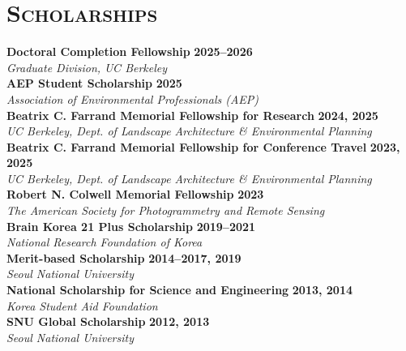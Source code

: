 \newcommand{\scholarship}[2]
  {\small \textbf{\color{maincolor} #1}
  \hfill \textbf{{\color{hlcolor-0} #2}}}
  
\newcommand{\sponsor}[1]
  {\small \color{hlcolor-0} \emph{#1}}
  
\section*{\textsc{Scholarships}}
\begin{cvcontent}
  \scholarship{Doctoral Completion Fellowship}{2025--2026}\\
  \sponsor{Graduate Division, UC Berkeley}\\ [0.5mm]
  \scholarship{AEP Student Scholarship}{2025}\\
  \sponsor{Association of Environmental Professionals (AEP)}\\ [0.5mm]
  \scholarship{Beatrix C. Farrand Memorial Fellowship for Research}{2024, 2025}\\
  \sponsor{UC Berkeley, Dept. of Landscape Architecture \& Environmental Planning}\\ [0.5mm]
  \scholarship{Beatrix C. Farrand Memorial Fellowship for Conference Travel}{2023, 2025}\\
  \sponsor{UC Berkeley, Dept. of Landscape Architecture \& Environmental Planning}\\ [0.5mm]
  \scholarship{Robert N. Colwell Memorial Fellowship}{2023}\\
  \sponsor{The American Society for Photogrammetry and Remote Sensing}\\[0.5mm]
  \scholarship{Brain Korea 21 Plus Scholarship}{2019--2021}\\
  \sponsor{National Research Foundation of Korea}\\ [0.5mm]
  \scholarship{Merit-based Scholarship}{2014--2017, 2019}\\
  \sponsor{Seoul National University}\\ [0.5mm]
  \scholarship{National Scholarship for Science and Engineering}{2013, 2014}\\[0.5mm]
  \sponsor{Korea Student Aid Foundation}\\ [0.5mm]
  \scholarship{SNU Global Scholarship}{2012, 2013}\\
  \sponsor{Seoul National University}
\end{cvcontent}